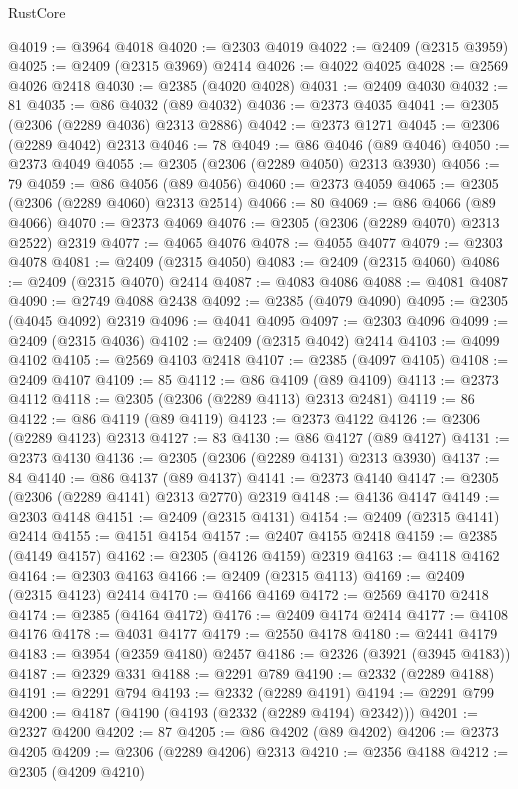 \begin{lexlean}{RustCore}
\begin{coremodule}
@4019 := @3964 @4018
@4020 := @2303 @4019
@4022 := @2409 (@2315 @3959)
@4025 := @2409 (@2315 @3969) @2414
@4026 := @4022 @4025
@4028 := @2569 @4026 @2418
@4030 := @2385 (@4020 @4028)
@4031 := @2409 @4030
@4032 := 81
@4035 := @86 @4032 (@89 @4032)
@4036 := @2373 @4035
@4041 := @2305 (@2306 (@2289 @4036) @2313 @2886)
@4042 := @2373 @1271
@4045 := @2306 (@2289 @4042) @2313
@4046 := 78
@4049 := @86 @4046 (@89 @4046)
@4050 := @2373 @4049
@4055 := @2305 (@2306 (@2289 @4050) @2313 @3930)
@4056 := 79
@4059 := @86 @4056 (@89 @4056)
@4060 := @2373 @4059
@4065 := @2305 (@2306 (@2289 @4060) @2313 @2514)
@4066 := 80
@4069 := @86 @4066 (@89 @4066)
@4070 := @2373 @4069
@4076 := @2305 (@2306 (@2289 @4070) @2313 @2522) @2319
@4077 := @4065 @4076
@4078 := @4055 @4077
@4079 := @2303 @4078
@4081 := @2409 (@2315 @4050)
@4083 := @2409 (@2315 @4060)
@4086 := @2409 (@2315 @4070) @2414
@4087 := @4083 @4086
@4088 := @4081 @4087
@4090 := @2749 @4088 @2438
@4092 := @2385 (@4079 @4090)
@4095 := @2305 (@4045 @4092) @2319
@4096 := @4041 @4095
@4097 := @2303 @4096
@4099 := @2409 (@2315 @4036)
@4102 := @2409 (@2315 @4042) @2414
@4103 := @4099 @4102
@4105 := @2569 @4103 @2418
@4107 := @2385 (@4097 @4105)
@4108 := @2409 @4107
@4109 := 85
@4112 := @86 @4109 (@89 @4109)
@4113 := @2373 @4112
@4118 := @2305 (@2306 (@2289 @4113) @2313 @2481)
@4119 := 86
@4122 := @86 @4119 (@89 @4119)
@4123 := @2373 @4122
@4126 := @2306 (@2289 @4123) @2313
@4127 := 83
@4130 := @86 @4127 (@89 @4127)
@4131 := @2373 @4130
@4136 := @2305 (@2306 (@2289 @4131) @2313 @3930)
@4137 := 84
@4140 := @86 @4137 (@89 @4137)
@4141 := @2373 @4140
@4147 := @2305 (@2306 (@2289 @4141) @2313 @2770) @2319
@4148 := @4136 @4147
@4149 := @2303 @4148
@4151 := @2409 (@2315 @4131)
@4154 := @2409 (@2315 @4141) @2414
@4155 := @4151 @4154
@4157 := @2407 @4155 @2418
@4159 := @2385 (@4149 @4157)
@4162 := @2305 (@4126 @4159) @2319
@4163 := @4118 @4162
@4164 := @2303 @4163
@4166 := @2409 (@2315 @4113)
@4169 := @2409 (@2315 @4123) @2414
@4170 := @4166 @4169
@4172 := @2569 @4170 @2418
@4174 := @2385 (@4164 @4172)
@4176 := @2409 @4174 @2414
@4177 := @4108 @4176
@4178 := @4031 @4177
@4179 := @2550 @4178
@4180 := @2441 @4179
@4183 := @3954 (@2359 @4180) @2457
@4186 := @2326 (@3921 (@3945 @4183))
@4187 := @2329 @331
@4188 := @2291 @789
@4190 := @2332 (@2289 @4188)
@4191 := @2291 @794
@4193 := @2332 (@2289 @4191)
@4194 := @2291 @799
@4200 := @4187 (@4190 (@4193 (@2332 (@2289 @4194) @2342)))
@4201 := @2327 @4200
@4202 := 87
@4205 := @86 @4202 (@89 @4202)
@4206 := @2373 @4205
@4209 := @2306 (@2289 @4206) @2313
@4210 := @2356 @4188
@4212 := @2305 (@4209 @4210)

\end{coremodule}
\end{lexlean}
